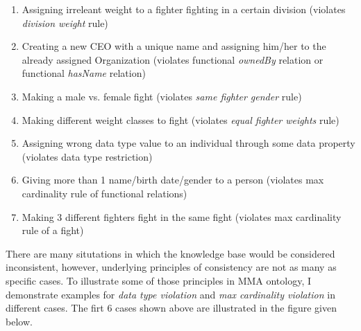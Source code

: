 \documentclass[a4paper]{article}
\begin{document}
\begin{enumerate}
	\item Assigning irreleant weight to a fighter fighting in a certain division (violates \textit{division weight} rule)
	\item Creating a new CEO with a unique name and assigning him/her to the already assigned Organization (violates functional \textit{ownedBy} relation or functional \textit{hasName} relation)
	\item Making a male vs. female fight (violates \textit{same fighter gender} rule)
	\item Making different weight classes to fight (violates \textit{equal fighter weights} rule)
	\item Assigning wrong data type value to an individual through some data property (violates data type restriction)
	\item Giving more than 1 name/birth date/gender to a person (violates max cardinality rule of functional relations)
	\item Making 3 different fighters fight in the same fight (violates max cardinality rule of a fight)
\end{enumerate}

There are many situtations in which the knowledge base would be considered inconsistent, however, underlying principles of consistency are not as many as specific cases. To illustrate some of those 
principles in MMA ontology, I demonstrate examples for \textit{data type violation} and \textit{max cardinality violation} in different cases. The firt 6 cases shown above are illustrated in the 
figure given below.
\end{document}
